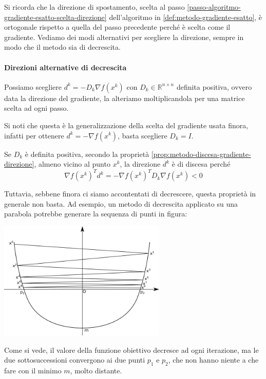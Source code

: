Si ricorda che la direzione di spostamento, scelta al passo
\ref{passo-algoritmo-gradiente-esatto-scelta-direzione} dell'algoritmo
in \ref{def:metodo-gradiente-esatto}, \`e ortogonale rispetto a quella
del passo precedente perch\'e \`e scelta come il gradiente. Vediamo dei
modi alternativi per scegliere la direzione, sempre in modo che il
metodo sia di decrescita.

\paragraph{Direzioni alternative di decrescita}
\label{par:direzioni-alternative-decrescita} Possiamo scegliere $d^{k}
= -D_{k} \nabla f(x^{k})$ con $D_k \in \mathbb{R}^{n\times n}$
definita positiva, ovvero data la direzione del gradiente, la
alteriamo moltiplicandola per una matrice scelta ad ogni passo.

Si noti che questa \`e la generalizzazione della scelta del gradiente
usata finora, infatti per ottenere $d^{k} = -\nabla f(x^{k})$,
basta scegliere $D_k = I$.

Se $D_k$ \`e definita positiva, secondo la propriet\`a
\ref{prop:metodo-discesa-gradiente-direzione}, almeno vicino al punto
$x^k$, la direzione $d^k$ \`e di discesa perch\'e
    $$ \nabla f(x^{k})^{T} d^{k} = - \nabla f(x^{k})^{T} D_k \nabla f(x^{k})< 0$$

Tuttavia, sebbene finora ci siamo accontentati di decrescere, questa
propriet\`a in generale non basta. Ad esempio, un metodo di decrescita
applicato su una parabola potrebbe generare la sequenza di punti in
figura:

\centerline{\includegraphics[width=0.60\textwidth]{imgs/parabola-no-convergenza.png}}

Come si vede, il valore della funzione obiettivo decresce ad ogni
iterazione, ma le due sottosuccessioni convergono ai due punti $p_1$ e
$p_2$, che non hanno niente a che fare con il minimo $m$, molto
distante.

